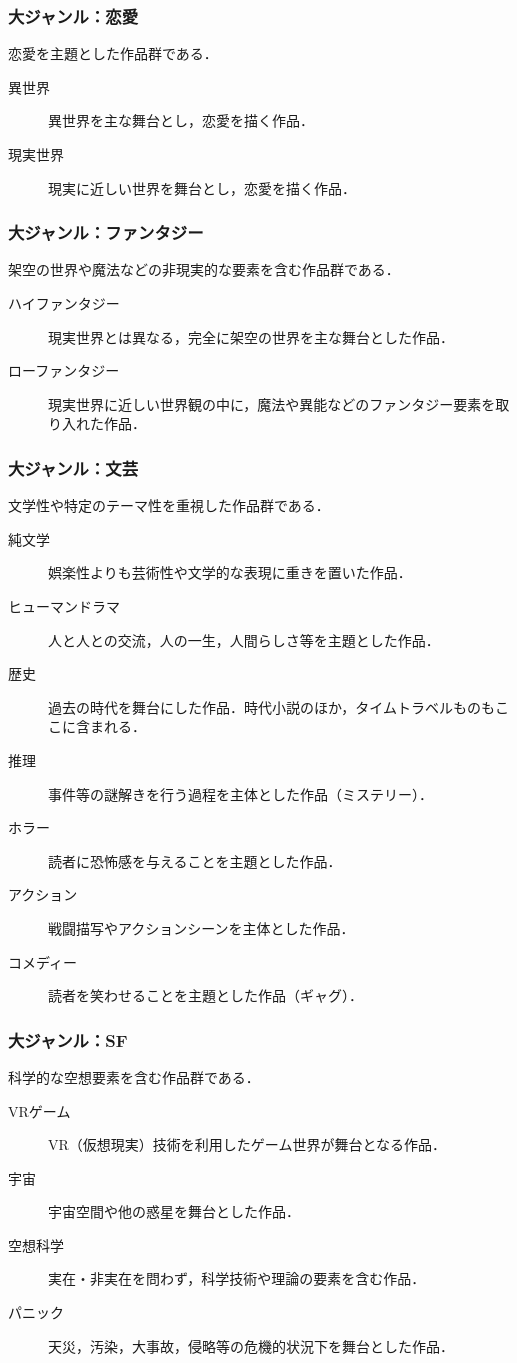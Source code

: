 \documentclass[uplatex, dvipdfmx, 11pt, a4paper, report]{jsbook}
\begin{document}
\subsubsection*{大ジャンル：恋愛}
恋愛を主題とした作品群である．
\begin{description}
    \item[異世界] 異世界を主な舞台とし，恋愛を描く作品．
    \item[現実世界] 現実に近しい世界を舞台とし，恋愛を描く作品．
\end{description}

\subsubsection*{大ジャンル：ファンタジー}
架空の世界や魔法などの非現実的な要素を含む作品群である．
\begin{description}
    \item[ハイファンタジー] 現実世界とは異なる，完全に架空の世界を主な舞台とした作品．
    \item[ローファンタジー] 現実世界に近しい世界観の中に，魔法や異能などのファンタジー要素を取り入れた作品．
\end{description}

\subsubsection*{大ジャンル：文芸}
文学性や特定のテーマ性を重視した作品群である．
\begin{description}
    \item[純文学] 娯楽性よりも芸術性や文学的な表現に重きを置いた作品．
    \item[ヒューマンドラマ] 人と人との交流，人の一生，人間らしさ等を主題とした作品．
    \item[歴史] 過去の時代を舞台にした作品．時代小説のほか，タイムトラベルものもここに含まれる．
    \item[推理] 事件等の謎解きを行う過程を主体とした作品（ミステリー）．
    \item[ホラー] 読者に恐怖感を与えることを主題とした作品．
    \item[アクション] 戦闘描写やアクションシーンを主体とした作品．
    \item[コメディー] 読者を笑わせることを主題とした作品（ギャグ）．
\end{description}

\subsubsection*{大ジャンル：SF}
科学的な空想要素を含む作品群である．
\begin{description}
    \item[VRゲーム] VR（仮想現実）技術を利用したゲーム世界が舞台となる作品．
    \item[宇宙] 宇宙空間や他の惑星を舞台とした作品．
    \item[空想科学] 実在・非実在を問わず，科学技術や理論の要素を含む作品．
    \item[パニック] 天災，汚染，大事故，侵略等の危機的状況下を舞台とした作品．
\end{description}
\end{document}
